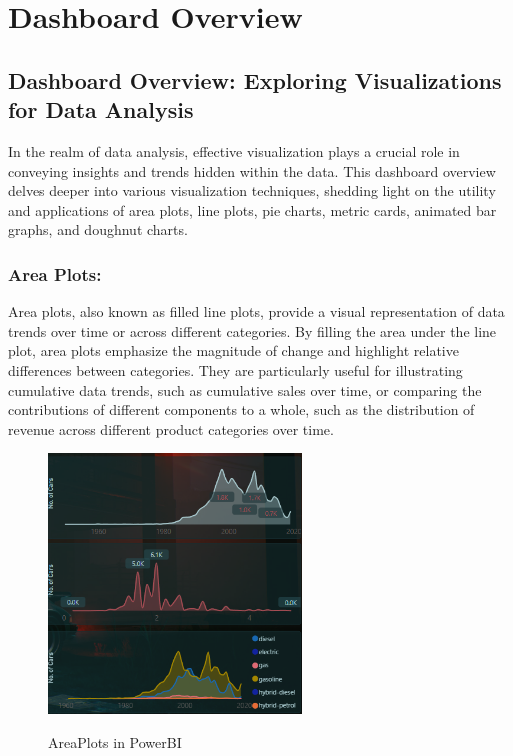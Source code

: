 \documentclass{article}
\begin{document}
\section{Dashboard Overview}
\vspace{1cm}
{\fontsize{15}{15}\selectfont

\subsection{Dashboard Overview: Exploring Visualizations for Data Analysis}

In the realm of data analysis, effective visualization plays a crucial role in conveying insights and trends hidden within the data. This dashboard overview delves deeper into various visualization techniques, shedding light on the utility and applications of area plots, line plots, pie charts, metric cards, animated bar graphs, and doughnut charts.

\subsubsection{Area Plots:}
Area plots, also known as filled line plots, provide a visual representation of data trends over time or across different categories. By filling the area under the line plot, area plots emphasize the magnitude of change and highlight relative differences between categories. They are particularly useful for illustrating cumulative data trends, such as cumulative sales over time, or comparing the contributions of different components to a whole, such as the distribution of revenue across different product categories over time.
\\
\begin{figure}[htbp]
  \centering
  \vspace{0.3cm}
  \includegraphics[width=0.6\textwidth]{Figures/PowerBI/areaplot.png}\\
  \caption{AreaPlots in PowerBI}
  \vspace{0.3cm}
\end{figure}
\\

}
\end{document}
